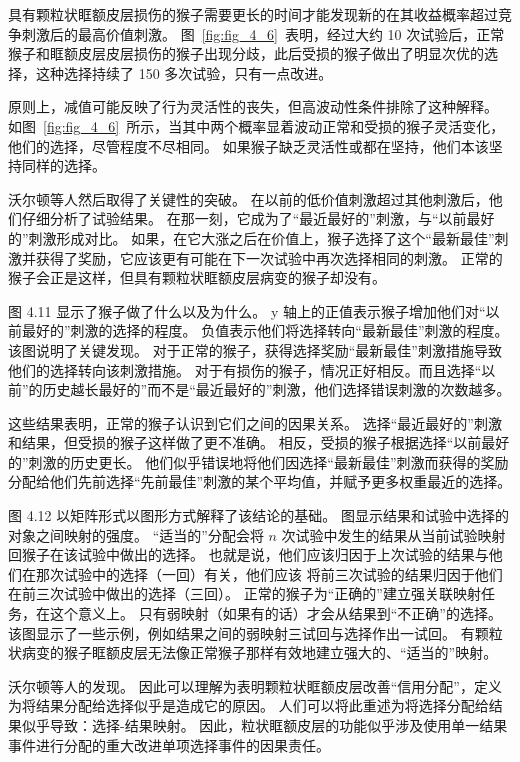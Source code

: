 具有颗粒状眶额皮层损伤的猴子需要更长的时间才能发现新的在其收益概率超过竞争刺激后的最高价值刺激。
图~\ref{fig:fig_4_6}~表明，经过大约 10 次试验后，正常猴子和眶额皮层皮层损伤的猴子出现分歧，此后受损的猴子做出了明显次优的选择，这种选择持续了 150 多次试验，只有一点改进。\par


原则上，减值可能反映了行为灵活性的丧失，但高波动性条件排除了这种解释。
如图~\ref{fig:fig_4_6}~所示，当其中两个概率显着波动正常和受损的猴子灵活变化，他们的选择，尽管程度不尽相同。
如果猴子缺乏灵活性或都在坚持，他们本该坚持同样的选择。\par


沃尔顿等人然后取得了关键性的突破。
在以前的低价值刺激超过其他刺激后，他们仔细分析了试验结果。
在那一刻，它成为了“最近最好的”刺激，与“以前最好的”刺激形成对比。
如果，在它大涨之后在价值上，猴子选择了这个“最新最佳”刺激并获得了奖励，它应该更有可能在下一次试验中再次选择相同的刺激。
正常的猴子会正是这样，但具有颗粒状眶额皮层病变的猴子却没有。\par


图 4.11 显示了猴子做了什么以及为什么。
y 轴上的正值表示猴子增加他们对“以前最好的”刺激的选择的程度。
负值表示他们将选择转向“最新最佳”刺激的程度。
该图说明了关键发现。
对于正常的猴子，获得选择奖励“最新最佳”刺激措施导致他们的选择转向该刺激措施。
对于有损伤的猴子，情况正好相反。而且选择“以前”的历史越长最好的”而不是“最近最好的”刺激，他们选择错误刺激的次数越多。\par


这些结果表明，正常的猴子认识到它们之间的因果关系。
选择“最近最好的”刺激和结果，但受损的猴子这样做了更不准确。
相反，受损的猴子根据选择“以前最好的”刺激的历史更长。
他们似乎错误地将他们因选择“最新最佳”刺激而获得的奖励分配给他们先前选择“先前最佳”刺激的某个平均值，并赋予更多权重最近的选择。\par


图 4.12 以矩阵形式以图形方式解释了该结论的基础。
图显示结果和试验中选择的对象之间映射的强度。
“适当的”分配会将 $ n $ 次试验中发生的结果从当前试验映射回猴子在该试验中做出的选择。
也就是说，他们应该归因于上次试验的结果与他们在那次试验中的选择（一回）有关，他们应该
将前三次试验的结果归因于他们在前三次试验中做出的选择（三回）。
正常的猴子为“正确的”建立强关联映射任务，在这个意义上。
只有弱映射（如果有的话）才会从结果到“不正确”的选择。
该图显示了一些示例，例如结果之间的弱映射三试回与选择作出一试回。
有颗粒状病变的猴子眶额皮层无法像正常猴子那样有效地建立强大的、“适当的”映射。\par


沃尔顿等人的发现。
因此可以理解为表明颗粒状眶额皮层改善“信用分配”，定义为将结果分配给选择似乎是造成它的原因。
人们可以将此重述为将选择分配给结果似乎导致：选择-结果映射。
因此，粒状眶额皮层的功能似乎涉及使用单一结果事件进行分配的重大改进单项选择事件的因果责任。\par


